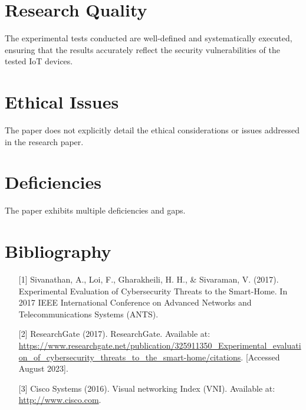 \documentclass[a4paper,12pt]{article}
\begin{document}
\begin{flushleft}
\section*{Research Quality}
The experimental tests conducted are well-defined and systematically executed, ensuring that the results accurately reflect the security vulnerabilities of the tested IoT devices. 

\vspace{0.5cm}

\section*{Ethical Issues}
The paper does not explicitly detail the ethical considerations or issues addressed in the research paper. 

\vspace{0.5cm}

\section*{Deficiencies}
The paper exhibits multiple deficiencies and gaps.

\vspace{0.5cm}

\section*{Bibliography}
\begin{itemize}
    \item[{[1]}] Sivanathan, A., Loi, F., Gharakheili, H. H., \& Sivaraman, V. (2017). Experimental Evaluation of Cybersecurity Threats to the Smart-Home. In 2017 IEEE International Conference on Advanced Networks and Telecommunications Systems (ANTS).
    \item[{[2]}] ResearchGate (2017). ResearchGate. Available at: \url{https://www.researchgate.net/publication/325911350_Experimental_evaluation_of_cybersecurity_threats_to_the_smart-home/citations}. [Accessed August 2023].
    \item[{[3]}] Cisco Systems (2016). Visual networking Index (VNI). Available at: \url{http://www.cisco.com}.
\end{itemize}

\end{flushleft}
\end{document}
